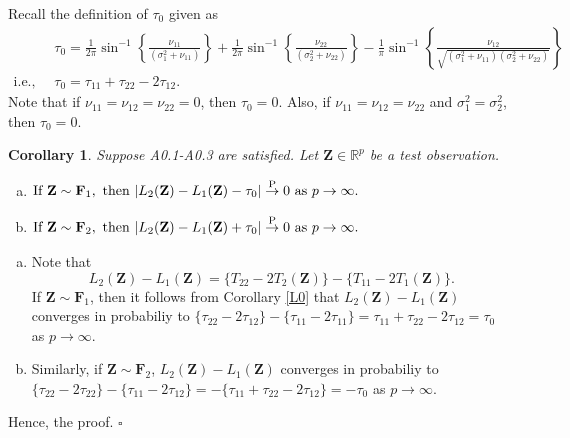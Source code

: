 \documentclass[twoside]{article}
\newcommand{\bZ}{\mathbf{Z}}
\newcommand{\bF}{\mathbf{F}}
\newcommand{\0}{\mathbf{0}}
\newcommand{\1}{\mathbf{1}}
\newcommand*{\QEDB}{\hfill\ensuremath{\square}}
\numberwithin{equation}{section}
\newtheorem{cor}[thm]{Corollary}
\begin{document}
Recall the definition of $\tau_0$ given as
\begin{align*}
 &\ \tau_0 = \frac{1}{2\pi}\sin^{-1}\left \{\frac{\nu_{11}}{(\sigma^2_1 + \nu_{11})}\right\}+ \frac{1}{2\pi}\sin^{-1}\left \{\frac{\nu_{22}}{(\sigma^2_2 + \nu_{22})}\right\}- \frac{1}{\pi}\sin^{-1}\left \{\frac{\nu_{12}}{\sqrt{(\sigma^2_1 + \nu_{11})(\sigma^2_2 + \nu_{22})}}\right\}\\
 \text{i.e., }&\ \tau_0=\tau_{11}+\tau_{22}-2\tau_{12}.
\end{align*}
Note that if $\nu_{11}=\nu_{12}=\nu_{22}=0$, then $\tau_0=0$. Also, if $\nu_{11}=\nu_{12}=\nu_{22}$ and $\sigma^2_1=\sigma^2_2$, then $\tau_0=0$.
\begin{cor}\label{C0}
 Suppose {\rm A0.1-A0.3} are satisfied. Let $\bZ\in\mathbb{R}^p$ be a test observation.
\begin{enumerate}[(a)]
\item  $\begin{aligned}[t]&\text{If }\bZ\sim\bF_1,\text{ then }
|L_2(\bZ)- L_1(\bZ) - \tau_0|\stackrel{\rm P}{\to}0\text{ as } p\to\infty .
 \end{aligned}$
\item  $\begin{aligned}[t]&\text{If }\bZ\sim\bF_2,\text{ then }
 |L_2(\bZ)- L_1(\bZ) + \tau_0|\stackrel{\rm P}{\to}0\text{ as } p\to\infty.
 \end{aligned}$
\end{enumerate}
\end{cor}
\begin{enumerate}[(a)]
 \item Note that $$L_2(\bZ)- L_1(\bZ)= \{T_{22}-2T_2(\bZ)\}- \{T_{11} - 2T_1(\bZ)\}.$$ If $\bZ\sim\bF_1$, then it follows from Corollary \ref{L0} that $L_2(\bZ)-L_1(\bZ)$ converges in probabiliy to $\{\tau_{22} - 2 \tau_{12}\} -\{ \tau_{11}-2\tau_{11}\}=\tau_{11}  + \tau_{22}- 2 \tau_{12}=\tau_0$ as $p\to\infty$.
 \item Similarly, if $\bZ\sim\bF_2$, $L_2(\bZ)-L_1(\bZ)$ converges in probabiliy to $\{\tau_{22} - 2 \tau_{22}\} -\{ \tau_{11}-2\tau_{12}\}=-\{\tau_{11}  + \tau_{22}- 2 \tau_{12}\}=-\tau_0$ as $p\to\infty$.
\end{enumerate}
Hence, the proof. \hfill\QEDB\newline
\end{document}
